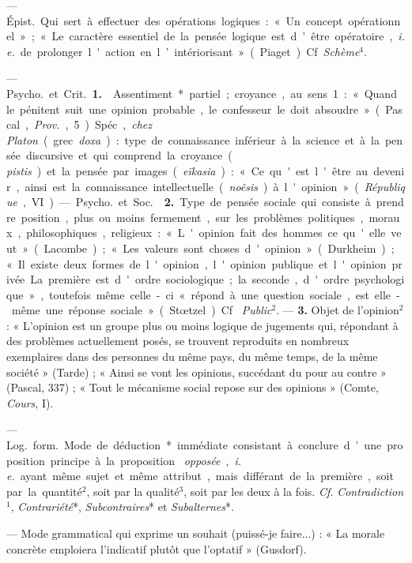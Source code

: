 \begin{itemize}[leftmargin=1cm, label=, itemsep=1pt]
 — \si{Épist.} Qui sert à effectuer des
opérations logiques : « Un concept opérationnel » ; « Le caractère essentiel
de la pensée logique est d’être opératoire, {\it i. e.} de prolonger l'action
en l’intériorisant » (Piaget). Cf. {\it Schème}$^4$.

 — \si{Psycho.} et \si{Crit.} {\bf 1.} 
Assentiment* partiel ; croyance, au sens 1 : « Quand le pénitent suit une
opinion probable, le confesseur le doit absoudre » (Pascal, {\it Prov.}, 5).
Spéc., {\it chez Platon} (grec {\it doxa}) : type de connaissance inférieur à
la science et à la pensée discursive et qui comprend la croyance ({\it
pistis}) et la pensée par images ({\it eïkasia}) : « Ce qu'est l'être au
devenir, ainsi est la connaissance intellectuelle ({\it noêsis}) à l'opinion
» ({\it République}, VI).

— \si{Psycho.} et \si{Soc.}  {\bf 2.} Type de
pensée sociale qui consiste à prendre position, plus ou moins fermement, sur
les problèmes politiques, moraux, philosophiques, religieux : « L'opinion
fait des hommes ce qu'elle veut » (Lacombe) ; « Les valeurs sont choses
d'opinion » (Durkheim) ; « Il existe deux formes de l'opinion, l'opinion
publique et l'opinion privée. La première est d'ordre sociologique ; ... la
seconde, d'ordre psychologique », toutefois même celle-ci « répond à une
question sociale, est elle-même une réponse sociale » (Stœtzel). Cf. {\it
Public}$^2$. —  {\bf 3.} Objet de l'opinion$^2$ : « L'opinion
est un groupe plus ou moins logique de jugements qui, répondant à des
problèmes actuellement posés, se trouvent reproduits en nombreux exemplaires
dans des personnes du même pays, du même temps, de la même société
» (Tarde) ; « Ainsi se vont les opinions, succédant du pour au contre
» (Pascal, 337) ; « Tout le mécanisme social repose sur des opinions
» (Comte, {\it Cours}, I).

 — \si{Log.} \si{form.} Mode de déduction* immédiate
consistant à conclure d’une proposition principe à la proposition {\it
opposée}, {\it i. e.} ayant même sujet et même attribut, mais différant de la
première, soit par la quantité$^2$, soit par la qualité$^3$, soit par les deux à
la fois. {\it Cf.} {\it Contradiction}$^1$, {\it Contrariété}*, {\it
Subcontraires}* et {\it Subalternes}*.

 — Mode grammatical qui exprime un souhait (puissé-je faire...) :
« La morale concrète emploiera l'indicatif plutôt que l’optatif » (Gusdorf).


\end{itemize}
